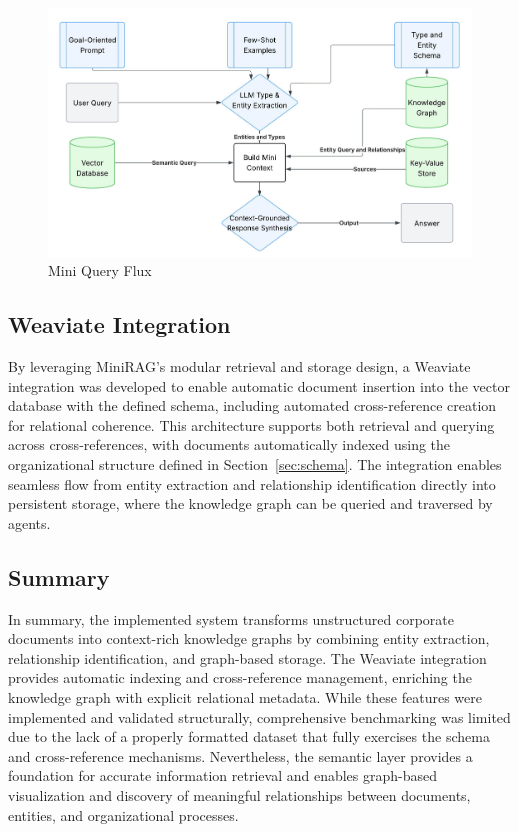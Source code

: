 \begin{figure}
    \centering
    \includegraphics[width=0.75\linewidth]{Images/Fluxograma_Mini_Query.jpeg}
    \caption{Mini Query Flux}\label{fig:mini-query-flux}
\end{figure}

\subsection{Weaviate Integration}

By leveraging MiniRAG's modular retrieval and storage design, a Weaviate integration was developed to enable automatic document insertion into the vector database with the defined schema, including automated cross-reference creation for relational coherence. This architecture supports both retrieval and querying across cross-references, with documents automatically indexed using the organizational structure defined in Section~\ref{sec:schema}. The integration enables seamless flow from entity extraction and relationship identification directly into persistent storage, where the knowledge graph can be queried and traversed by agents.

\subsection{Summary}

In summary, the implemented system transforms unstructured corporate documents into context-rich knowledge graphs by combining entity extraction, relationship identification, and graph-based storage. The Weaviate integration provides automatic indexing and cross-reference management, enriching the knowledge graph with explicit relational metadata. While these features were implemented and validated structurally, comprehensive benchmarking was limited due to the lack of a properly formatted dataset that fully exercises the schema and cross-reference mechanisms. Nevertheless, the semantic layer provides a foundation for accurate information retrieval and enables graph-based visualization and discovery of meaningful relationships between documents, entities, and organizational processes.

